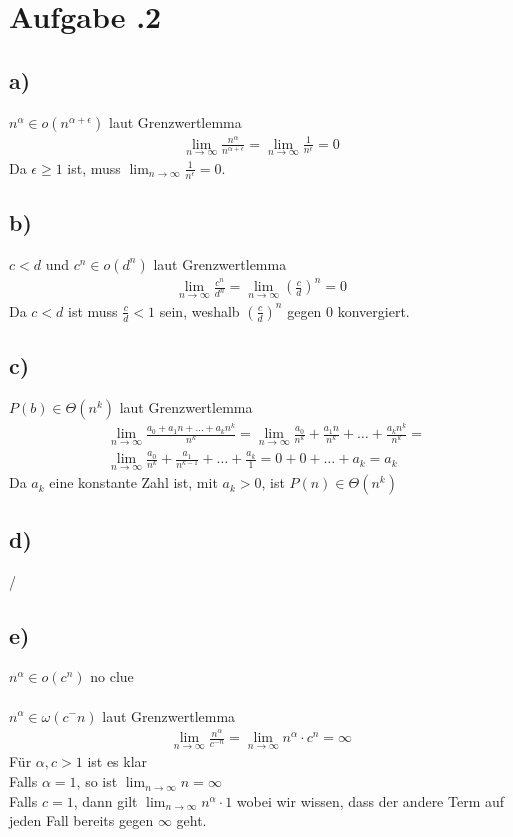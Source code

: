 \newpage
\section*{Aufgabe \bn.2}
\subsection*{a)}
$n ^{ \alpha }\in o(n ^{ \alpha + \epsilon } )$ laut Grenzwertlemma
\begin{align*}
  \lim_{n \rightarrow \infty} \frac{ n ^{ \alpha } }{ n ^{ \alpha + \epsilon }  } =
  \lim_{n \rightarrow \infty} \frac{ 1 }{ n ^{ \epsilon }  }  = 0
\end{align*}
Da $\epsilon \ge 1$ ist, muss $\lim_{n \rightarrow \infty} \frac{ 1 }{ n ^{ \epsilon }  }  = 0$.
\subsection*{b)}
$c < d$ und $c^n\in o(d^n)$ laut Grenzwertlemma
\begin{align*}
  \lim_{n \rightarrow \infty} \frac{ c^n }{ d^n } = \lim_{n \rightarrow \infty} \left( \frac{ c }{ d }  \right)^n = 0
\end{align*}
Da $c<d$ ist muss $\frac{ c }{ d } < 1$ sein, weshalb $ \left( \frac{ c }{ d }  \right)^n $ gegen 0 konvergiert.
\subsection*{c)}
$P(b) \in \Theta(n^k)$ laut Grenzwertlemma
\begin{align*}
  &\lim_{n \rightarrow \infty} \frac{ a_0 + a_1n + \ldots + a_kn^k }{ n^k } = \lim_{n \rightarrow \infty} \frac{ a_0 }{ n^k } + \frac{ a_1n }{ n^k } + \ldots + \frac{ a_kn^k }{ n^k } = \\
  &\lim_{n \rightarrow \infty} \frac{ a_0 }{ n^k } + \frac{ a_1 }{ n^{k-1} } + \ldots + \frac{ a_k }{ 1 } = 0 + 0 + \ldots + a_k = a_k
\end{align*}
Da $a_k$ eine konstante Zahl ist, mit $a_k > 0$, ist $P(n)\in\Theta(n^k)$
\subsection*{d)}
/
\subsection*{e)}
$n^\alpha \in o(c^n)$ no clue\\\\
$n^\alpha \in \omega(c^-n)$ laut Grenzwertlemma
\begin{align*}
  \lim_{n \rightarrow \infty} \frac{ n^\alpha }{ c^{-n} } = \lim_{n \rightarrow \infty} n^\alpha \cdot c^n = \infty
\end{align*}
Für $\alpha,c > 1$ ist es klar\\
Falls $\alpha = 1$, so ist $\lim_{n \rightarrow \infty} n =\infty$ \\
Falls $c = 1$, dann gilt $ \lim_{n \rightarrow \infty} n^\alpha \cdot 1 $ wobei wir wissen, dass der andere Term auf jeden Fall bereits gegen $\infty$ geht.



